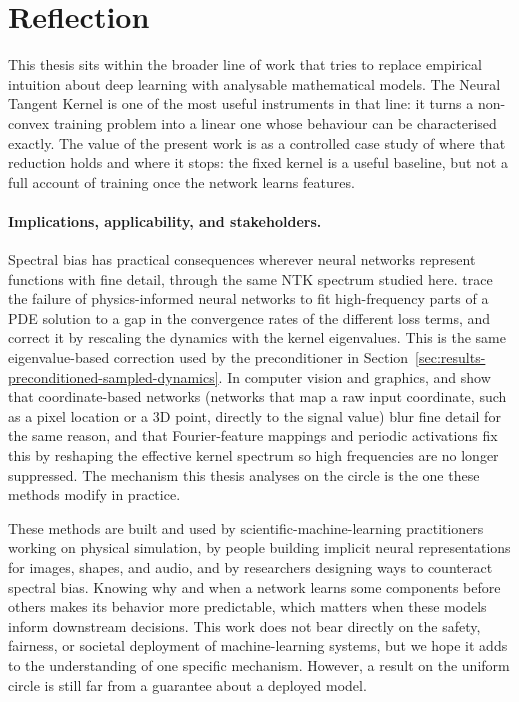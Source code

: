 \section{Reflection}
\label{sec:discussion-reflection}

This thesis sits within the broader line of work that tries to replace empirical
intuition about deep learning with analysable mathematical models. The Neural
Tangent Kernel is one of the most useful instruments in that line: it turns a
non-convex training problem into a linear one whose behaviour can be
characterised exactly. The value of the present work is as a controlled case
study of where that reduction holds and where it stops: the fixed kernel is a
useful baseline, but not a full account of training once the network learns
features.

\paragraph{Implications, applicability, and stakeholders.}
Spectral bias has practical consequences wherever neural networks represent
functions with fine detail, through the same NTK spectrum studied here.
\citet{wang2022whenpinnsfail} trace the failure of physics-informed neural
networks to fit high-frequency parts of a PDE solution to a gap in the
convergence rates of the different loss terms, and correct it by rescaling the
dynamics with the kernel eigenvalues. This is the same eigenvalue-based correction
used by the preconditioner in
Section~\ref{sec:results-preconditioned-sampled-dynamics}. In computer vision and
graphics, \citet{tancik2020fourierfeatures} and \citet{sitzmann2020siren} show
that coordinate-based networks (networks that map a raw input coordinate, such as a
pixel location or a 3D point, directly to the signal value) blur fine
detail for the same reason, and that
Fourier-feature mappings and periodic activations fix this by reshaping the
effective kernel spectrum so high frequencies are no longer suppressed. The
mechanism this thesis analyses on the circle is the one these methods modify in
practice.

These methods are built and used by scientific-machine-learning practitioners
working on physical simulation, by people building implicit neural
representations for images, shapes, and audio, and by researchers designing ways
to counteract spectral bias.
Knowing why and when a network learns some components before others makes its
behavior more predictable, which matters when these models inform downstream
decisions. This work does not bear directly on the safety, fairness, or societal
deployment of machine-learning systems, but we hope it adds to the understanding of one
specific mechanism. However, a result on the uniform circle is still far from a
guarantee about a deployed model.

